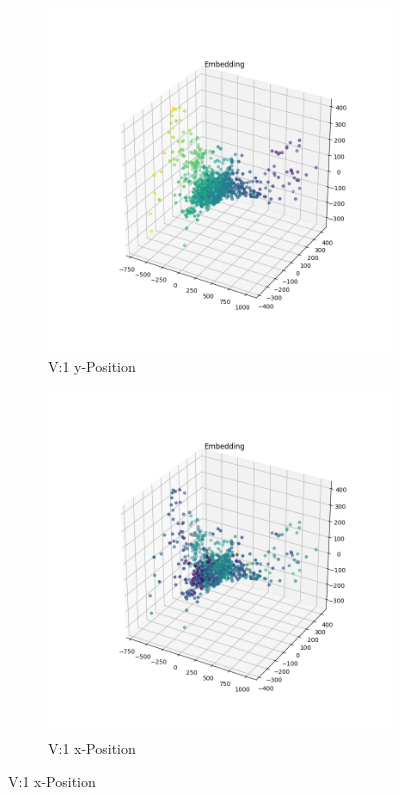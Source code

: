 \begin{figure}[h]
	\centering
	\begin{subfigure}[c]{0.49\textwidth}			
		\includegraphics[width=1\textwidth,center]{bilder/Hauptteil/MT_Grapple/EMB_alle/1_Embedding_y.png}
		\caption{V:1 y-Position}
		\label{img:Einbettung1_y}	
	\end{subfigure}
	\centering
	\begin{subfigure}[c]{0.49\textwidth}			
		\includegraphics[width=1\textwidth,center]{bilder/Hauptteil/MT_Grapple/EMB_alle/1_Embedding_x.png}
		\caption{V:1 x-Position}
		\label{img:Einbettung1_x}		
	\end{subfigure}
	

\end{figure}
